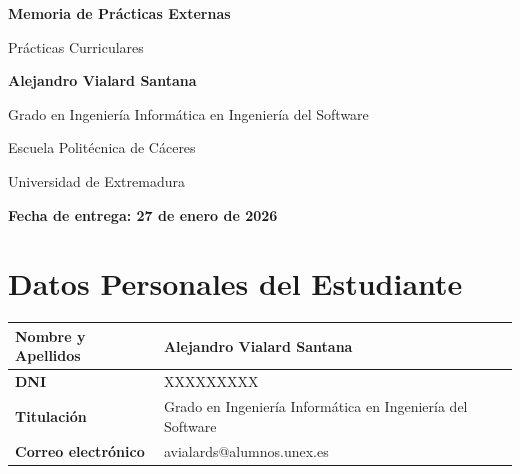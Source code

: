 \documentclass[12pt,a4paper]{article}
\begin{document}
\begin{titlepage}
    \centering
    \vspace*{2cm}
    
    {\Huge\bfseries Memoria de Prácticas Externas\par}
    \vspace{1cm}
    {\Large Prácticas Curriculares\par}
    
    \vspace{2cm}
    
    \begin{figure}[h]
        \centering
    \end{figure}
    
    \vspace{2cm}
    
    {\LARGE\bfseries Alejandro Vialard Santana\par}
    \vspace{0.5cm}
    {\Large Grado en Ingeniería Informática en Ingeniería del Software\par}
    
    \vspace{2cm}
    
    {\large Escuela Politécnica de Cáceres\par}
    {\large Universidad de Extremadura\par}
    
    \vspace{2cm}
    
    {\large\bfseries Fecha de entrega: 27 de enero de 2026\par}
    
    \vfill
\end{titlepage}

\tableofcontents
\newpage

\section{Datos Personales del Estudiante}

\begin{table}[h]
\centering
\begin{tabularx}{\textwidth}{|l|X|}
\hline
\textbf{Nombre y Apellidos} & Alejandro Vialard Santana \\
\hline
\textbf{DNI} & XXXXXXXXX \\
\hline
\textbf{Titulación} & Grado en Ingeniería Informática en Ingeniería del Software \\
\hline
\textbf{Correo electrónico} & avialards@alumnos.unex.es \\
\hline
\end{tabularx}
\end{table}
\end{document}
